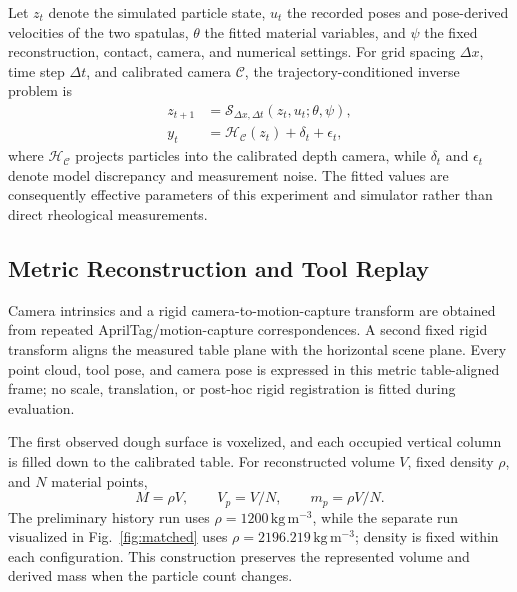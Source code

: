 Let $z_t$ denote the simulated particle state, $u_t$ the recorded poses and pose-derived velocities of the two spatulas, $\theta$ the fitted material variables, and $\psi$ the fixed reconstruction, contact, camera, and numerical settings. For grid spacing $\Delta x$, time step $\Delta t$, and calibrated camera $\mathcal{C}$, the trajectory-conditioned inverse problem is
\begin{equation}
\begin{aligned}
z_{t+1} &= \mathcal{S}_{\Delta x,\Delta t}(z_t,u_t;\theta,\psi),\\
y_t &= \mathcal{H}_{\mathcal{C}}(z_t)+\delta_t+\epsilon_t,
\end{aligned}
\label{eq:inverse_problem}
\end{equation}
where $\mathcal{H}_{\mathcal{C}}$ projects particles into the calibrated depth camera, while $\delta_t$ and $\epsilon_t$ denote model discrepancy and measurement noise. The fitted values are consequently effective parameters of this experiment and simulator rather than direct rheological measurements.

\subsection{Metric Reconstruction and Tool Replay}

Camera intrinsics and a rigid camera-to-motion-capture transform are obtained from repeated AprilTag/motion-capture correspondences. A second fixed rigid transform aligns the measured table plane with the horizontal scene plane. Every point cloud, tool pose, and camera pose is expressed in this metric table-aligned frame; no scale, translation, or post-hoc rigid registration is fitted during evaluation.

The first observed dough surface is voxelized, and each occupied vertical column is filled down to the calibrated table. For reconstructed volume $V$, fixed density $\rho$, and $N$ material points,
\begin{equation}
 M=\rho V,\qquad V_p=V/N,\qquad m_p=\rho V/N.
 \label{eq:mass_initialization}
\end{equation}
The preliminary history run uses $\rho=1200\,\mathrm{kg\,m^{-3}}$, while the separate run visualized in Fig.~\ref{fig:matched} uses $\rho=2196.219\,\mathrm{kg\,m^{-3}}$; density is fixed within each configuration. This construction preserves the represented volume and derived mass when the particle count changes.

